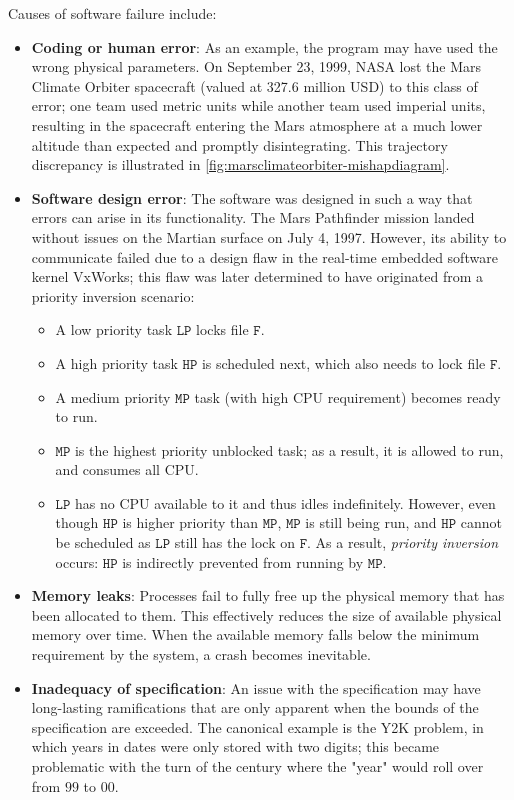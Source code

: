 Causes of software failure include: \begin{itemize}
\item \textbf{Coding or human error}: As an example, the program may have used the wrong physical parameters. On September 23, 1999, NASA lost the Mars Climate Orbiter spacecraft (valued at 327.6 million USD) to this class of error; one team used metric units while another team used imperial units, resulting in the spacecraft entering the Mars atmosphere at a much lower altitude than expected and promptly disintegrating. This trajectory discrepancy is illustrated in \autoref{fig:marsclimateorbiter-mishapdiagram}. 
\item \textbf{Software design error}: The software was designed in such a way that errors can arise in its functionality. The Mars Pathfinder mission landed without issues on the Martian surface on July 4, 1997. However, its ability to communicate failed due to a design flaw in the real-time embedded software kernel VxWorks; this flaw was later determined to have originated from a priority inversion scenario: \begin{itemize}
\item A low priority task $\mathtt{LP}$ locks file $\mathtt{F}$.
\item A high priority task $\mathtt{HP}$ is scheduled next, which also needs to lock file $\mathtt{F}$.
\item A medium priority $\mathtt{MP}$ task (with high CPU requirement) becomes ready to run.
\item $\mathtt{MP}$ is the highest priority unblocked task; as a result, it is allowed to run, and consumes all CPU.
\item $\mathtt{LP}$ has no CPU available to it and thus idles indefinitely. However, even though $\mathtt{HP}$ is higher priority than $\mathtt{MP}$, $\mathtt{MP}$ is still being run, and $\mathtt{HP}$ cannot be scheduled as $\mathtt{LP}$ still has the lock on $\mathtt{F}$. As a result, \textit{priority inversion} occurs: $\mathtt{HP}$ is indirectly prevented from running by $\mathtt{MP}$.
\end{itemize}
\item \textbf{Memory leaks}: Processes fail to fully free up the physical memory that has been allocated to them. This effectively reduces the size of available physical memory over time. When the available memory falls below the minimum requirement by the system, a crash becomes inevitable.
\item \textbf{Inadequacy of specification}: An issue with the specification may have long-lasting ramifications that are only apparent when the bounds of the specification are exceeded. The canonical example is the Y2K problem, in which years in dates were only stored with two digits; this became problematic with the turn of the century where the "year" would roll over from $99$ to $00$.
\end{itemize}

